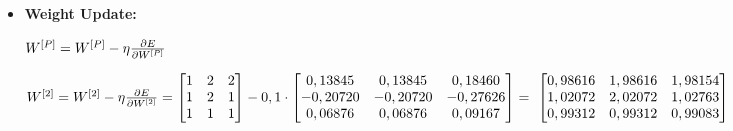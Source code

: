 \documentclass[12pt]{article}
\begin{document}
\begin{enumerate}[leftmargin=\labelsep, label=\textbf{\arabic*.)}]
\begin{itemize}
\begin{center}
                    \end{center}
              \item \textbf{Weight Update:}
                    \begin{center}
                        \vspace{0.25cm}

                        $W^{[P]} = W^{[P]} - \eta \pdv{E}{W^{[P]}}$
                        \vspace{0.5em}

                        $W^{[2]} = W^{[2]} - \eta \pdv{E}{W^{[2]}} = \begin{bmatrix}
                                1 & 2 & 2 \\
                                1 & 2 & 1 \\
                                1 & 1 & 1
                            \end{bmatrix} - 0,1 \cdot \begin{bmatrix}
                                0,13845  & 0,13845  & 0,18460  \\
                                -0,20720 & -0,20720 & -0,27626 \\
                                0,06876  & 0,06876  & 0,09167
                            \end{bmatrix} = \ \begin{bmatrix}
                                0,98616 & 1,98616 & 1,98154 \\
                                1,02072 & 2,02072 & 1,02763 \\
                                0,99312 & 0,99312 & 0,99083
                            \end{bmatrix}$

                        \vspace{0.25cm}


\end{center}
\end{itemize}
\end{enumerate}
\end{document}
